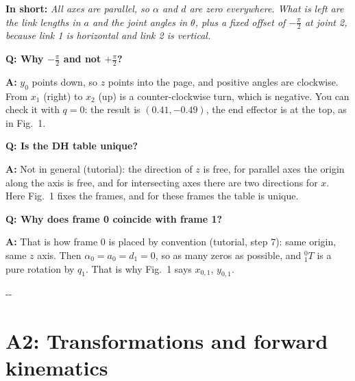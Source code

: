 \documentclass[10pt,a4paper]{article}
\makeatletter
\newcommand{\secneed}[1]{\par\penalty\@M\begingroup\setlength{\dimen@}{#1}\dimen@ii\pagegoal
  \advance\dimen@ii-\pagetotal\ifdim\dimen@>\dimen@ii\ifdim\dimen@ii>\z@\vfil\fi\penalty-\@M\fi\endgroup}
\let\oldsection\section
\renewcommand{\section}{\secneed{9\baselineskip}\oldsection}
\newcommand{\frage}[2]{\textbf{Q: #1}\par\nopagebreak\vspace{1pt}\textbf{A:} #2\par\vspace{5pt}}
\newcommand{\sagen}[1]{\textbf{In short:} \emph{#1}\par}
\makeatother
\begin{document}
\sagen{All axes are parallel, so $\alpha$ and $d$ are zero everywhere. What is left are the link lengths in $a$ and the
joint angles in $\theta$, plus a fixed offset of $-\frac{\pi}{2}$ at joint 2, because link 1 is horizontal and link 2 is
vertical.}

\begin{fragen}
\frage{Why $-\frac{\pi}{2}$ and not $+\frac{\pi}{2}$?}
{$y_0$ points down, so $z$ points into the page, and positive angles are clockwise. From $x_1$ (right) to $x_2$ (up) is a
counter-clockwise turn, which is negative. You can check it with $q = 0$: the result is $(0.41, -0.49)$, the end effector
is at the top, as in Fig.~1.}
\frage{Is the DH table unique?}
{Not in general (tutorial): the direction of $z$ is free, for parallel axes the origin along the axis is free, and for
intersecting axes there are two directions for $x$. Here Fig.~1 fixes the frames, and for these frames the table is
unique.}
\frage{Why does frame 0 coincide with frame 1?}
{That is how frame 0 is placed by convention (tutorial, step 7): same origin, same $z$ axis. Then
$\alpha_0 = a_0 = d_1 = 0$, so as many zeros as possible, and ${}^0_1T$ is a pure rotation by $q_1$. That is why Fig.~1
says $x_{0,1}$, $y_{0,1}$.}
\end{fragen}

\section{A2: Transformations and forward kinematics}
\end{document}
